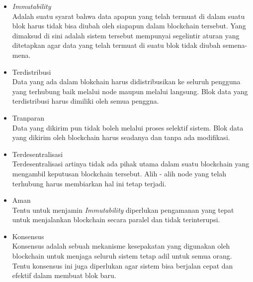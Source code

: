 \begin{itemize}
\item{\emph{Immutability}}\\Adalah suatu syarat bahwa data apapun yang telah termuat di dalam suatu blok harus tidak bisa diubah oleh siapapun dalam blockchain tersebut. Yang dimaksud di sini adalah sistem tersebut mempunyai segelintir aturan yang ditetapkan agar data yang telah termuat di suatu blok tidak diubah semena-mena.
\item{Terdistribusi}\\Data yang ada dalam blokchain harus didistribusikan ke seluruh pengguna yang terhubung baik melalui node maupun melalui langsung. Blok data yang terdistribusi harus dimiliki oleh semua penggna.
\item{Tranparan}\\Data yang dikirim pun tidak boleh melalui proses selektif sistem. Blok data yang dikirim oleh blockchain harus seadanya dan tanpa ada modifikasi.
\item{Terdesentralisasi}\\Terdesentralisasi artinya tidak ada pihak utama dalam suatu blockchain yang mengambil keputusan blockchain tersebut. Alih - alih node yang telah terhubung harus membiarkan hal ini tetap terjadi.
\item{Aman}\\Tentu untuk menjamin \emph{Immutability} diperlukan pengamanan yang tepat untuk menjalankan blockchain secara paralel dan tidak terinterupsi.
\item{Konsensus}\\Konsensus adalah sebuah mekanisme kesepakatan yang digunakan oleh blockchain untuk menjaga seluruh sistem tetap adil untuk semua orang. Tentu konsensus ini juga diperlukan agar sistem bisa berjalan cepat dan efektif dalam membuat blok baru.
\end{itemize}

